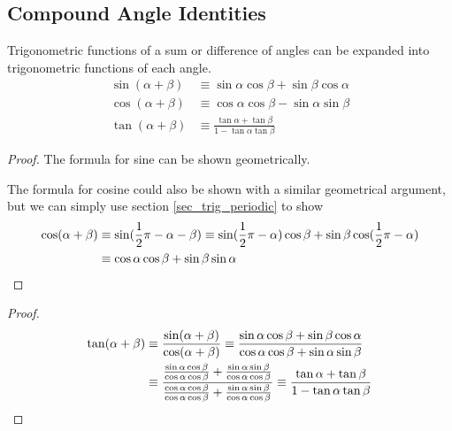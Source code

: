 \subsection{Compound Angle Identities} \label{sec_comp_angle}


\begin{theorem}
Trigonometric functions of a sum or difference of angles can be expanded into
trigonometric functions of each angle.
\begin{align*}
\sin(\alpha + \beta) &\equiv
   \sin \alpha \cos \beta +  \sin \beta \cos \alpha \\
\cos(\alpha + \beta) &\equiv
   \cos \alpha \cos \beta - \sin \alpha \sin \beta \\
\tan(\alpha + \beta) &\equiv
    \frac{\tan \alpha + \tan \beta}{1 - \tan \alpha \tan \beta}
\end{align*}
\end{theorem}
\begin{proof}
The formula for sine can be shown geometrically.

The formula for cosine could also be shown with a similar geometrical argument,
but we can simply use section \ref{sec_trig_periodic} to show
\begin{align*}
\cos(\alpha + \beta) &\equiv
    \sin(\frac 12 \pi - \alpha - \beta) \equiv
    \sin(\frac 12 \pi - \alpha)\cos \beta +
        \sin \beta \cos(\frac 12 \pi - \alpha) \\
&\equiv
    \cos \alpha \cos \beta + \sin \beta \sin \alpha \qedhere
\end{align*}
\end{proof}
\begin{proof}
\begin{align*}
\tan(\alpha + \beta) &\equiv
    \frac{\sin(\alpha + \beta)}{\cos(\alpha + \beta)} \equiv
    \frac{\sin \alpha \cos \beta + \sin \beta \cos \alpha}
         {\cos \alpha \cos \beta + \sin \alpha \sin \beta} \\
    &\equiv \frac{
          \frac{\sin \alpha \cos \beta}{\cos \alpha \cos \beta} +
          \frac{\sin \alpha \sin \beta}{\cos \alpha \cos \beta}}
         {\frac{\cos \alpha \cos \beta}{\cos \alpha \cos \beta} +
          \frac{\sin \alpha \sin \beta}{\cos \alpha \cos \beta}}
         \equiv
    \frac{\tan \alpha + \tan \beta}{1 - \tan \alpha \tan \beta} \qedhere
\end{align*}
\end{proof}

